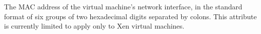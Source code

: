 \begin {description}

\item[\AdAttr{VM\_MACAddr}:] The MAC address of the virtual
machine's network interface,
in the standard format of six groups of
two hexadecimal digits separated by colons.
This attribute is currently limited to apply only to Xen virtual machines.






\end{description}
